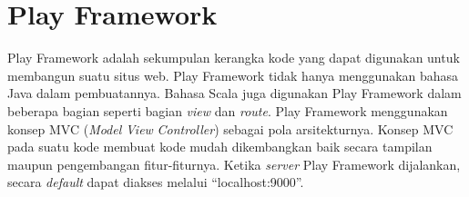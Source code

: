 \section{Play Framework}
\label{sec:play_framework}
Play Framework adalah sekumpulan kerangka kode yang dapat digunakan untuk membangun suatu situs web\cite{playforjava}. Play Framework tidak hanya menggunakan bahasa Java dalam pembuatannya. Bahasa Scala juga digunakan Play Framework dalam beberapa bagian seperti bagian \textit{view} dan \textit{route}. Play Framework menggunakan konsep MVC (\textit{Model} \textit{View} \textit{Controller}) sebagai pola arsitekturnya. Konsep MVC pada suatu kode membuat kode mudah dikembangkan baik secara tampilan maupun pengembangan fitur-fiturnya. Ketika \textit{server} Play Framework dijalankan, secara \textit{default} dapat diakses melalui ``localhost:9000''.

